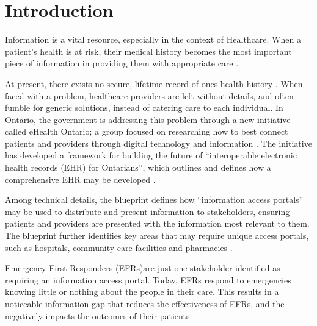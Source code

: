 
\section{Introduction}


\hspace{6mm}Information is a vital resource, especially in the context of Healthcare. When a patient's health is at risk, their medical history becomes the most important piece of information in providing them with appropriate care \cite{web1}.

At present, there exists no secure, lifetime record of ones health history \cite{Street2014}. When faced with a problem, healthcare providers are left without details, and often fumble for generic solutions, instead of catering care to each individual. In Ontario, the government is addressing this problem through a new initiative called eHealth Ontario; a group focused on researching how to best connect patients and providers through digital technology and information \cite{web1}. The initiative has developed a framework for building the future of ``interoperable electronic health records (EHR) for Ontarians'', which outlines and defines how a comprehensive EHR may be developed \cite{b1}.

Among technical details, the blueprint defines how ``information access portals'' may be used to distribute and present information to stakeholders, ensuring patients and providers are presented with the information most relevant to them. The blueprint further identifies key areas that may require unique access portals, such as hospitals, community care facilities and pharmacies \cite{Street2014}.

Emergency First Responders (EFRs)are just one stakeholder identified as requiring an information access portal. Today, EFRs respond to emergencies knowing little or nothing about the people in their care. This results in a noticeable information gap that reduces the effectiveness of EFRs, and the negatively impacts the outcomes of their patients. \iffalse reducing the effectiveness of EFRs, and   during treatment. This is unfortunate, considering how beneficial information is in improving patient outcomes. \fi

